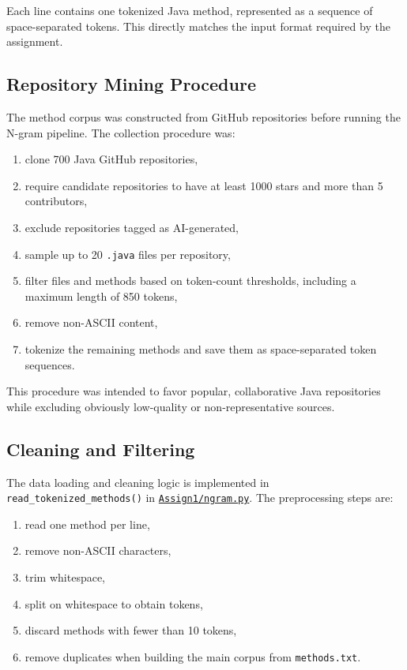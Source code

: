 \documentclass[11pt]{article}
\newcommand{\repoURL}{https://github.com/ABasloe/CSCI555}
\begin{document}
Each line contains one tokenized Java method, represented as a sequence of space-separated tokens. This directly matches the input format required by the assignment.

\subsection{Repository Mining Procedure}
The method corpus was constructed from GitHub repositories before running the N-gram pipeline. The collection procedure was:
\begin{enumerate}[leftmargin=*]
  \item clone 700 Java GitHub repositories,
  \item require candidate repositories to have at least 1000 stars and more than 5 contributors,
  \item exclude repositories tagged as AI-generated,
  \item sample up to 20 \texttt{.java} files per repository,
  \item filter files and methods based on token-count thresholds, including a maximum length of 850 tokens,
  \item remove non-ASCII content,
  \item tokenize the remaining methods and save them as space-separated token sequences.
\end{enumerate}

This procedure was intended to favor popular, collaborative Java repositories while excluding obviously low-quality or non-representative sources.

\subsection{Cleaning and Filtering}
The data loading and cleaning logic is implemented in \texttt{read\_tokenized\_methods()} in \href{\repoURL/blob/main/Assign1/ngram.py}{\texttt{Assign1/ngram.py}}. The preprocessing steps are:
\begin{enumerate}[leftmargin=*]
  \item read one method per line,
  \item remove non-ASCII characters,
  \item trim whitespace,
  \item split on whitespace to obtain tokens,
  \item discard methods with fewer than 10 tokens,
  \item remove duplicates when building the main corpus from \texttt{methods.txt}.
\end{enumerate}
\end{document}
